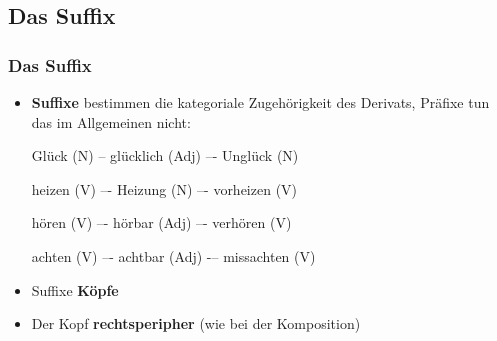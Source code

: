 \subsection{Das Suffix}

\begin{frame}
\frametitle{Das Suffix}

\begin{itemize}
	\item \textbf{Suffixe} bestimmen die kategoriale Zugehörigkeit des Derivats, Präfixe tun das im Allgemeinen nicht:


	\ea Glück (N) -- glücklich (Adj) –- Unglück (N)
	\z
	
	\ea heizen (V) –- Heizung (N) –- vorheizen (V)
	\z
	
	\ea hören (V) –- hörbar (Adj) –- verhören (V)
	\z
	
	\ea achten (V) –- achtbar (Adj) -– missachten (V)
	\z

	\item Suffixe \ras \textbf{Köpfe}

	\item Der Kopf  \ras \textbf{rechtsperipher} (wie bei der Komposition)
\end{itemize}

\end{frame}




